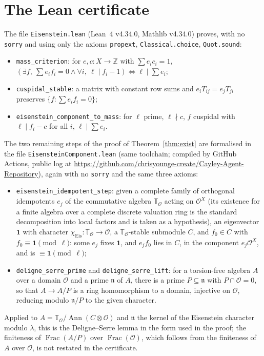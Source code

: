 \documentclass[11pt]{amsart}
\theoremstyle{definition}
\newcommand{\Z}{\mathbb{Z}}\newcommand{\Q}{\mathbb{Q}}\newcommand{\R}{\mathbb{R}}\newcommand{\A}{\mathbb{A}}\newcommand{\F}{\mathbb{F}}
\newcommand{\T}{\mathbb{T}}\newcommand{\Tr}{\operatorname{Tr}}\newcommand{\Aut}{\operatorname{Aut}}\newcommand{\Stab}{\operatorname{Stab}}
\newcommand{\Eis}{\mathrm{Eis}}\newcommand{\Gt}{G_2}\newcommand{\Ff}{F_4}
\begin{document}
\section{The Lean certificate}\label{app:lean}
The file \texttt{Eisenstein.lean} (Lean~4 v4.34.0, Mathlib v4.34.0) proves, with no \texttt{sorry} and using only the axioms \texttt{propext}, \texttt{Classical.choice}, \texttt{Quot.sound}:
\begin{itemize}
\item \texttt{mass\_criterion}: for $e,c:X\to\Z$ with $\sum e_ic_i=1$, $(\exists f,\ \sum e_if_i=0\wedge\forall i,\ \ell\mid f_i-1)\iff\ell\mid\sum e_i$;
\item \texttt{cuspidal\_stable}: a matrix with constant row sums and $e_iT_{ij}=e_jT_{ji}$ preserves $\{f:\sum e_if_i=0\}$;
\item \texttt{eisenstein\_component\_to\_mass}: for $\ell$ prime, $\ell\nmid c$, $f$ cuspidal with $\ell\mid f_i-c$ for all $i$, $\ell\mid\sum e_i$.
\end{itemize}
The two remaining steps of the proof of Theorem~\ref{thm:exist} are formalised in the file \texttt{EisensteinComponent.lean} (same toolchain; compiled by GitHub Actions, public log at \url{https://github.com/chrisyounge-create/Cayley-Agent-Repository}), again with no \texttt{sorry} and the same three axioms:
\begin{itemize}
\item \texttt{eisenstein\_idempotent\_step}: given a complete family of orthogonal idempotents $e_j$ of the commutative algebra $\T_{\mathcal O}$ acting on $\mathcal O^X$ (its existence for a finite algebra over a complete discrete valuation ring is the standard decomposition into local factors and is taken as a hypothesis), an eigenvector $\mathbf 1$ with character $\chi_{\Eis}:\T_{\mathcal O}\to\mathcal O$, a $\T_{\mathcal O}$-stable submodule $C$, and $f_0\in C$ with $f_0\equiv\mathbf 1\pmod{\ell}$: some $e_j$ fixes $\mathbf 1$, and $e_jf_0$ lies in $C$, in the component $e_j\mathcal O^X$, and is $\equiv\mathbf 1\pmod\ell$;
\item \texttt{deligne\_serre\_prime} and \texttt{deligne\_serre\_lift}: for a torsion-free algebra $A$ over a domain $\mathcal O$ and a prime $\mathfrak n$ of $A$, there is a prime $P\subseteq\mathfrak n$ with $P\cap\mathcal O=0$, so that $A\to A/P$ is a ring homomorphism to a domain, injective on $\mathcal O$, reducing modulo $\mathfrak n/P$ to the given character.
\end{itemize}
Applied to $A=\T_{\mathcal O}/\operatorname{Ann}(C\otimes\mathcal O)$ and $\mathfrak n$ the kernel of the Eisenstein character modulo $\lambda$, this is the Deligne--Serre lemma in the form used in the proof; the finiteness of $\operatorname{Frac}(A/P)$ over $\operatorname{Frac}(\mathcal O)$, which follows from the finiteness of $A$ over $\mathcal O$, is not restated in the certificate.
\end{document}
